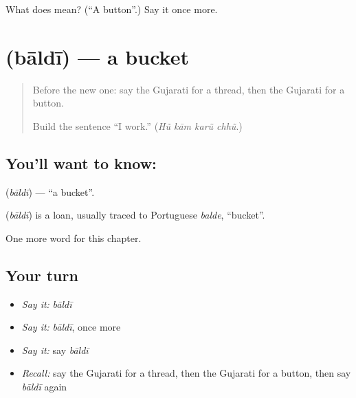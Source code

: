 \begin{tcolorbox}[breakable,colback=teal!4,colframe=teal!35!black,title={Before you move on}]
What does  mean? (\textquotedblleft{}A button\textquotedblright{}.) Say it once more.
\end{tcolorbox}
\section[\texorpdfstring{\gu{બાલદી} (bāldī)}{બાલદી (bāldī)}]{ (bāldī) — a bucket}

\label{lesson:GU-C109-baldi}



\begin{quote}
Before the new one: say the Gujarati for a thread, then the Gujarati for a button.

Build the sentence \textquotedblleft{}I work.\textquotedblright{} (\emph{Hũ kām karũ chhũ}.)
\end{quote}

\subsection*{You'll want to know: }
\textbf{} (\emph{bāldī}) — \textquotedblleft{}a bucket\textquotedblright{}.

\begin{cousinweb}
\textbf{} (\emph{bāldī}) is a loan, usually traced to Portuguese \emph{balde}, \textquotedblleft{}bucket\textquotedblright{}.
\end{cousinweb}

\begin{grammarlens}[title={What you've built}]
One more word for this chapter.
\end{grammarlens}

\subsection*{Your turn}
\begin{itemize}
\raggedright
  \item \emph{Say it:} \emph{bāldī}
  \item \emph{Say it:} \emph{bāldī}, once more
  \item \emph{Say it:} say \emph{bāldī}
  \item \emph{Recall:} say the Gujarati for a thread, then the Gujarati for a button, then say \emph{bāldī} again
\end{itemize}

